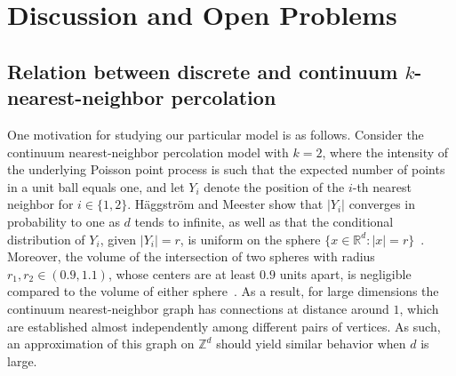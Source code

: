 \documentclass[oneside]{amsart}
\theoremstyle{definition}
\newcommand{\1}{\mathbbm{1}}
\newcommand{\0}{\mathbf{o}}
\newcommand{\R}{\mathbb{R}}
\newcommand{\Z}{\mathbb{Z}}
\numberwithin{equation}{section}
\begin{document}
\section{Discussion and Open Problems}\label{sec:discussion}
\subsection{Relation between discrete and continuum $k$-nearest-neighbor percolation}\label{sec:motivation}
One motivation for studying our particular model is as follows. Consider the continuum nearest-neighbor percolation model with $k=2$, where the intensity of the underlying Poisson point process is such that the expected number of points in a unit ball equals one, and let $Y_i$ denote the position of the $i$-th nearest neighbor for $i\in\{1,2\}$. H\"aggström and Meester show that $|Y_i|$ converges in probability to one as $d$ tends to infinite, as well as that the conditional distribution of $Y_i$, given $|Y_i|=r$, is uniform on the sphere $\{x\in \R^d: |x|=r\}$~\cite[Lemma $3.2$]{HaggMee96}. Moreover, the volume of the intersection of two spheres with radius $r_1,r_2\in(0.9,1.1)$, whose centers are at least $0.9$ units apart, is negligible compared to the volume of either sphere~\cite[Lemma $3.3$]{HaggMee96}. As a result, for large dimensions the continuum nearest-neighbor graph has connections at distance around $1$, which are established almost independently among different pairs of vertices. As such, an approximation of this graph on $\Z^d$ should yield similar behavior when $d$ is large. 
\end{document}
